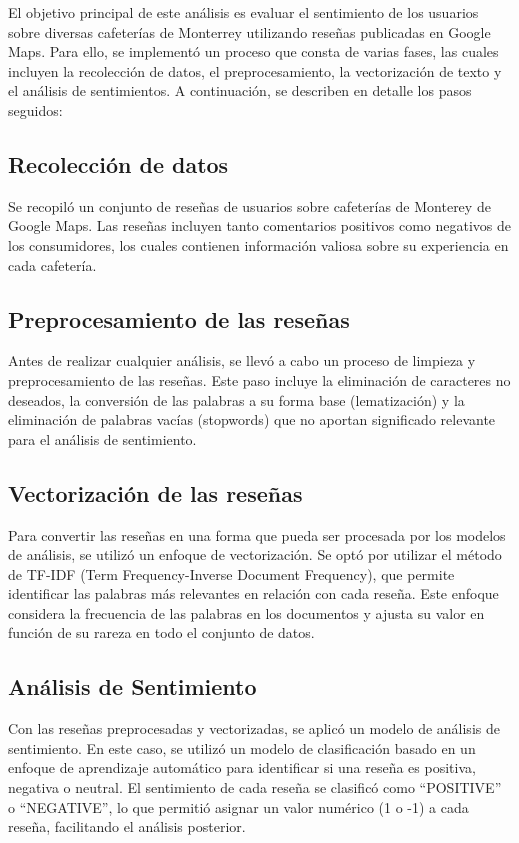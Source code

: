 \documentclass[journal]{IEEEtran}
\begin{document}
El objetivo principal de este análisis es evaluar el sentimiento de los usuarios sobre diversas cafeterías de Monterrey utilizando reseñas publicadas en Google Maps. Para ello, se implementó un proceso que consta de varias fases, las cuales incluyen la recolección de datos, el preprocesamiento, la vectorización de texto y el análisis de sentimientos. A continuación, se describen en detalle los pasos seguidos:
\subsection{Recolección de datos}
Se recopiló un conjunto de reseñas de usuarios sobre cafeterías de Monterey de Google Maps. Las reseñas incluyen tanto comentarios positivos como negativos de los consumidores, los cuales contienen información valiosa sobre su experiencia en cada cafetería.
\subsection{Preprocesamiento de las reseñas}
Antes de realizar cualquier análisis, se llevó a cabo un proceso de limpieza y preprocesamiento de las reseñas. Este paso incluye la eliminación de caracteres no deseados, la conversión de las palabras a su forma base (lematización) y la eliminación de palabras vacías (stopwords) que no aportan significado relevante para el análisis de sentimiento.
\subsection{Vectorización de las reseñas}
Para convertir las reseñas en una forma que pueda ser procesada por los modelos de análisis, se utilizó un enfoque de vectorización. Se optó por utilizar el método de TF-IDF (Term Frequency-Inverse Document Frequency), que permite identificar las palabras más relevantes en relación con cada reseña. Este enfoque considera la frecuencia de las palabras en los documentos y ajusta su valor en función de su rareza en todo el conjunto de datos.
\subsection{Análisis de Sentimiento}
Con las reseñas preprocesadas y vectorizadas, se aplicó un modelo de análisis de sentimiento. En este caso, se utilizó un modelo de clasificación basado en un enfoque de aprendizaje automático para identificar si una reseña es positiva, negativa o neutral. El sentimiento de cada reseña se clasificó como “POSITIVE” o “NEGATIVE”, lo que permitió asignar un valor numérico (1 o -1) a cada reseña, facilitando el análisis posterior.
\end{document}
